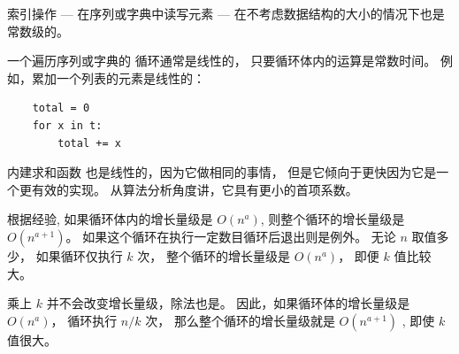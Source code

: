 索引操作 --- 在序列或字典中读写元素 --- 在不考虑数据结构的大小的情况下也是常数级的。


一个遍历序列或字典的  循环通常是线性的， 只要循环体内的运算是常数时间。
例如，累加一个列表的元素是线性的：

\begin{lstlisting}
    total = 0
    for x in t:
        total += x
\end{lstlisting}


内建求和函数  也是线性的，因为它做相同的事情，
但是它倾向于更快因为它是一个更有效的实现。
从算法分析角度讲，它具有更小的首项系数。


根据经验, 如果循环体内的增长量级是 $O(n^a)$, 则整个循环的增长量级是 $O(n^{a+1})$。
如果这个循环在执行一定数目循环后退出则是例外。 无论 $n$ 取值多少， 如果循环仅执行 $k$ 次， 整个循环的增长量级是 $O(n^a)$， 即便 $k$ 值比较大。


乘上 $k$ 并不会改变增长量级，除法也是。 因此，如果循环体的增长量级是 $O(n^a)$， 循环执行 $n/k$ 次， 那么整个循环的增长量级就是 $O(n^{a+1})$ , 即使 $k$ 值很大。


